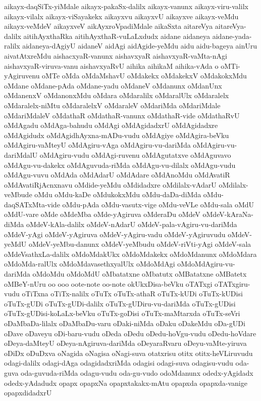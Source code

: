 {aikayx-daqSiTx-yiMdale
aikayx-pakaSx-dalilx
aikayx-vanunx
aikayx-viru-valilx
aikayx-vilalx
aikayx-viSayakekx
aikayxvu
aikayxvU
aikayxve
aikayx-veMdu
aikayx-veMdeV
aikayxveV
aikAyxroVpadiMdale
aikaSxta
aitareVya
aitareVya-dalilx
aitihAyxthaRka
aitihAyxthaR-vuLaLxdudx
aidane
aidaneya
aidane-yada-ralilx
aidaneya-dAgiyU
aidaneV
aidAgi
aidAgide-yeMdu
aidu
aidu-bageya
ainUru
aivatAtxreMdu
aishacxyaR-vanunx
aishavxyaR
aishavxyaR-vaMta-nAgi
aishavxyaR-viruva-vanu
aishavxyaRvU
aihika
aihikaM
aihika-vAda
o
oMTi-yAgiruvenu
oMTe
oMda
oMdaMshavU
oMdakekx
oMdakekxV
oMdakokxMdu
oMdane
oMdane-pAda
oMdane-yadu
oMdaneV
oMdanunx
oMdanUnx
oMdanenxV
oMdanonxMdu
oMdara
oMdaralilx
oMdaralUlx
oMdaralelx
oMdaralelx-niMtu
oMdaralelxV
oMdaraleV
oMdariMda
oMdariMdale
oMdariMdaleV
oMdathaR
oMdathaR-vanunx
oMdathaR-vide
oMdathaRvU
oMdAgadu
oMdAga-bahudu
oMdAgi
oMdAgidadxrU
oMdAgidadxre
oMdAgidudx
oMdAgidhAyxna-mADu-vudu
oMdAgiye
oMdAgira-beVku
oMdAgiru-vaMteyU
oMdAgiru-vAga
oMdAgiru-vu-dariMda
oMdAgiru-vu-dariMdalU
oMdAgiru-vudu
oMdAgi-ruvenu
oMdAgutatxve
oMdAguvavo
oMdAgu-vu-dakekx
oMdAguvuda-riMda
oMdAgu-vu-dilalx
oMdAgu-vudu
oMdAgu-vuvu
oMdAda
oMdAdarU
oMdAdare
oMdAnoMdu
oMdAvatiR
oMdAvatiRjAcnxnavu
oMdide-yeMdu
oMdidadxre
oMdilalx-vAdarU
oMdilalx-veMbude
oMdu
oMdu-kaDe
oMdukokxMdu
oMdu-daDa-diMda
oMdu-daqSATxMta-vide
oMdu-pAda
oMdu-vasutx-vige
oMdu-veVLe
oMdu-sala
oMdU
oMdU-vare
oMde
oMdeMba
oMde-yAgiruva
oMderaDu
oMdeV
oMdeV-kAraNa-diMda
oMdeV-kAla-dalilx
oMdeV-nAdarU
oMdeV-pala-vAgiru-vu-dariMda
oMdeV-yAgi
oMdeV-yAgiruva
oMdeV-yAgiru-vadu
oMdeV-yAgiruvudu
oMdeV-yeMdU
oMdeV-yeMbu-danunx
oMdeV-yeMbudu
oMdeV-riVti-yAgi
oMdeV-sala
oMdeVsathxLa-dalilx
oMdoMdakUkx
oMdoMdakekx
oMdoMdanunx
oMdoMdara
oMdoMda-ralUlx
oMdoMdavasethxyalUlx
oMdoMdAgi
oMdoMdAgiru-vu-dariMda
oMdoMdu
oMdoMdU
oMbatatxne
oMbatutx
oMBatatxne
oMBatetx
oMBeY-nUru
oo
ooo
oote-note
oo-note
okUkxDisa-beVku
oTATxgi
oTATxgiru-vudu
oTiTxna
oTiTx-nalilx
oTuTx
oTuTx-athaR
oTuTx-kUDi
oTuTx-kUDisi
oTuTx-gUDi
oTuTx-gUDi-dalilx
oTuTx-gUDiru-vu-dariMda
oTuTx-gUDisi
oTuTx-gUDisi-koLaLx-beVku
oTuTx-goDisi
oTuTx-maMtarxda
oTuTx-seVri
oDaMbaDa-lilalx
oDaMbaDu-varu
oDaki-niMda
oDaku
oDakeMdu
oDa-gUDi
oDave
oDaveyu
oDi-baru-vudu
oDeda
oDedu
oDedu-hoVgu-vudu
oDedu-hoVdare
oDeya-daMteyU
oDeya-nAgiruva-dariMda
oDeyaraRvaru
oDeyu-vaMte-yiruva
oDiDx
oDuDxva
oNagida
oNagisa
oNagi-suva
otatxrisu
otitx
otitx-heVLiruvudu
odagi-dalilx
odagi-dAga
odagidadxriMda
odagisi
odagi-suva
odagisu-vudu
oda-guva
oda-guvuda-riMda
odagu-vudu
oda-gu-vudo
odoMdanunx
odedx-yAgidadx
odedx-yAdadudx
opapx
opapxNa
opapxtakakx-mAtu
opapxda
opapxda-vanige
opapxdidadxrU
}
